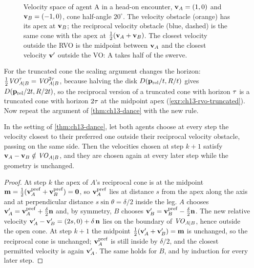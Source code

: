 \begin{figure}[tb]
  \centering
  \caption{Velocity space of agent A in a head-on encounter,
  $\mathbf{v}_A = (1, 0)$ and $\mathbf{v}_B = (-1, 0)$, cone half-angle $20^\circ$. The
  velocity obstacle (orange) has its apex at $\mathbf{v}_B$; the reciprocal
  velocity obstacle (blue, dashed) is the same cone with the apex at
  $\tfrac12(\mathbf{v}_A + \mathbf{v}_B)$. The closest velocity outside the RVO is the
  midpoint between $\mathbf{v}_A$ and the closest velocity $\mathbf{v}'$ outside the VO:
  A takes half of the swerve.}
  \label{fig:ch13-rvo}
\end{figure}

For the truncated cone the scaling argument changes the horizon:
$\tfrac12\mathit{VO}^{\tau}_{A|B} = \mathit{VO}^{2\tau}_{A|B}$, because halving the disk
$D(\mathbf{p}_{\mathrm{rel}}/t,R/t)$ gives $D(\mathbf{p}_{\mathrm{rel}}/2t,R/2t)$,
so the reciprocal version of a truncated cone with horizon $\tau$ is a
truncated cone with horizon $2\tau$ at the midpoint apex
(\cref{exr:ch13-rvo-truncated}). Now repeat the argument of
\cref{thm:ch13-dance} with the new rule.

\begin{proposition}
\label{thm:ch13-rvo-stable}
In the setting of \cref{thm:ch13-dance}, let both agents choose at every
step the velocity closest to their preferred one outside their reciprocal
velocity obstacle, passing on the same side. Then the velocities chosen at
step $k+1$ satisfy $\mathbf{v}_A - \mathbf{v}_B \notin \mathit{VO}_{A|B}$, and they are chosen
again at every later step while the geometry is unchanged.
\end{proposition}
\begin{proof}
At step $k$ the apex of $A$'s reciprocal cone is at the midpoint
$\mathbf{m} = \tfrac12(\mathbf{v}_A^{\mathrm{pref}} + \mathbf{v}_B^{\mathrm{pref}}) =
\mathbf{0}$, so $\mathbf{v}_A^{\mathrm{pref}}$ lies at distance $s$ from the apex
along the axis and at perpendicular distance $s\sin\theta = \delta/2$ inside
the leg. $A$ chooses $\mathbf{v}_A' = \mathbf{v}_A^{\mathrm{pref}} + \tfrac{\delta}{2}\mathbf{n}$
and, by symmetry, $B$ chooses $\mathbf{v}_B' = \mathbf{v}_B^{\mathrm{pref}} -
\tfrac{\delta}{2}\mathbf{n}$. The new relative velocity
$\mathbf{v}_A' - \mathbf{v}_B' = (2s, 0) + \delta\,\mathbf{n}$ lies on the boundary of
$\mathit{VO}_{A|B}$, hence outside the open cone. At step $k+1$ the midpoint
$\tfrac12(\mathbf{v}_A' + \mathbf{v}_B') = \mathbf{m}$ is unchanged, so the reciprocal
cone is unchanged; $\mathbf{v}_A^{\mathrm{pref}}$ is still inside by
$\delta/2$, and the closest permitted velocity is again $\mathbf{v}_A'$. The same
holds for $B$, and by induction for every later step.
\end{proof}

